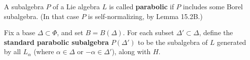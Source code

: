 A subalgebra $P$ of a Lie algebra $L$ is called \textbf{parabolic} if $P$ includes some Borel subalgebra. (In that case $P$ is self-normalizing, by Lemma 15.2B.)

Fix a base $\Delta \subset \Phi$, and set $B = B(\Delta)$. For each subset $\Delta' \subset \Delta$, define the \textbf{standard parabolic subalgebra} $P(\Delta')$ to be the subalgebra of $L$ generated by all $L_{\alpha}$ (where $\alpha \in \Delta$ or $-\alpha \in \Delta'$), along with $H$.
